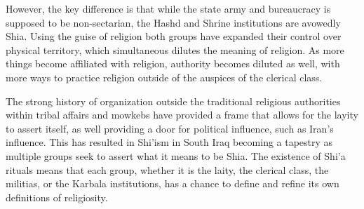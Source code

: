 However, the key difference is that while the state army and bureaucracy is supposed to be non-sectarian, the Hashd and Shrine institutions are avowedly Shia. Using the guise of religion both groups have expanded their control over physical territory, which simultaneous dilutes the meaning of religion. As more things become affiliated with religion, authority becomes diluted as well, with more ways to practice religion outside of the auspices of the clerical class. 

The strong history of organization outside the traditional religious authorities within tribal affairs and mowkebs have provided a frame that allows for the layity to assert itself, as well providing a door for political influence, such as Iran's influence. This has resulted in Shi'ism in South Iraq becoming a tapestry as multiple groups seek to assert what it means to be Shia. The existence of Shi'a rituals means that each group, whether it is the laity, the clerical class, the militias, or the Karbala institutions, has a chance to define and refine its own definitions of religiosity. 


